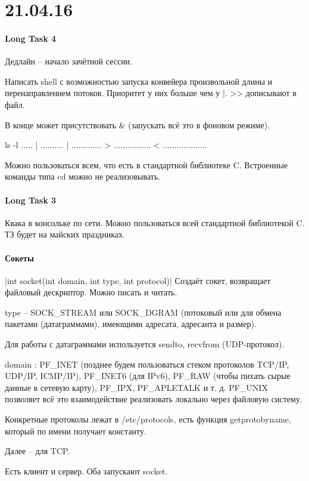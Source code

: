 \documentclass[a4paper,10pt]{article}
\newcommand{\cl}{\mint{c}}
\begin{document}
\section{21.04.16}
\paragraph{Long Task 4}
Дедлайн -- начало зачётной сессии.

Написать shell с возможностью запуска конвейера произвольной длины и перенаправлением потоков. Приоритет у них больше чем у |.  >> дописывают в файл.

В конце может присутствовать \& (запускать всё это в фоновом режиме).

ls -l ..... | .......... | ............. > ................ < ...................

Можно пользоваться всем, что есть в стандартной библиотеке C. Встроенные команды типа cd можно не реализовывать.

\paragraph{Long Task 3}
Квака в консольке по сети. Можно пользоваться всей стандартной библиотекой C. ТЗ будет на майских праздниках.

\paragraph{Сокеты}
\cl|int socket(int domain, int type, int protocol)| Создаёт сокет, возвращает файловый дескриптор. Можно писать и читать.

type -- SOCK\_STREAM или SOCK\_DGRAM (потоковый или для обмена пакетами (датаграммами), имеющими адресата, адресанта и размер).

Для работы с датаграммами используется sendto, recvfrom (UDP-протокол).

domain : PF\_INET (позднее будем пользоваться стеком протоколов TCP/IP, UDP/IP, ICMP/IP), 
PF\_INET6 (для IPv6), 
PF\_RAW (чтобы пихать сырые данные в сетевую карту), 
PF\_IPX, PF\_APLETALK и т. д.
PF\_UNIX позволяет всё это взаимодействие реализовать локально через файловую систему.

Конкретные протоколы лежат в /etc/protocols, есть функция getprotobyname, который по имени получает константу.

Далее -- для TCP.

Есть клиент и сервер. Оба запускают socket. 
\end{document}
